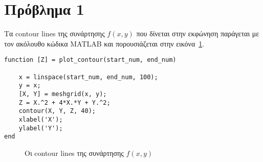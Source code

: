 \section{Πρόβλημα 1}

Τα contour lines της συνάρτησης $f(x,y)$ που δίνεται στην εκφώνηση παράγεται με τον ακόλουθο κώδικα MATLAB και πορουσιάζεται στην εικόνα~\ref{fig:prob_1_contour_lines}.

\begin{lstlisting}[]
function [Z] = plot_contour(start_num, end_num)
	
	x = linspace(start_num, end_num, 100);
	y = x;
	[X, Y] = meshgrid(x, y);
	Z = X.^2 + 4*X.*Y + Y.^2;
	contour(X, Y, Z, 40);
	xlabel('X');
	ylabel('Y');
end
\end{lstlisting}
\begin{figure}[h]
	\centering
	
	\caption{Οι contour lines της συνάρτησης $f(x,y)$}
	\label{fig:prob_1_contour_lines}
\end{figure}


